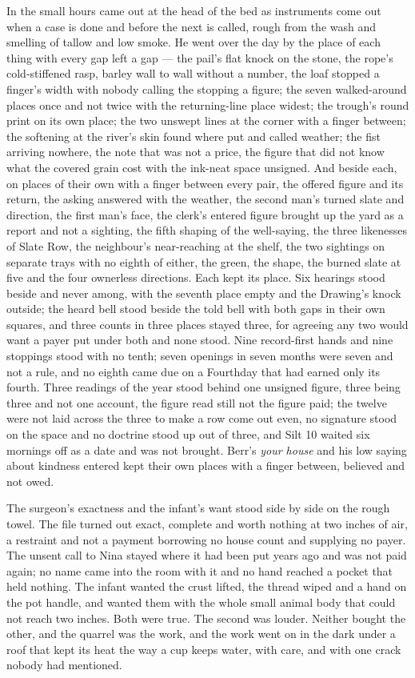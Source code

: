 In the small hours  came out at the head of the bed as instruments come out when a case is done and before the next is called, rough from the wash and smelling of tallow and low smoke. He went over the day by the place of each thing with every gap left a gap --- the pail's flat knock on the stone, the rope's cold-stiffened rasp, barley wall to wall without a number, the loaf stopped a finger's width with nobody calling the stopping a figure; the seven walked-around places once and not twice with the returning-line place widest; the trough's round print on its own place; the two unswept lines at the corner with a finger between; the softening at the river's skin found where put and called weather; the fist arriving nowhere, the note that was not a price, the figure that did not know what the covered grain cost with the ink-neat space unsigned. And beside each, on places of their own with a finger between every pair, the offered figure and its return, the asking answered with the weather, the second man's turned slate and direction, the first man's face, the clerk's entered figure brought up the yard as a report and not a sighting, the fifth shaping of the well-saying, the three likenesses of Slate Row, the neighbour's near-reaching at the shelf, the two sightings on separate trays with no eighth of either, the green, the shape, the burned slate at five and the four ownerless directions. Each kept its place. Six hearings stood beside and never among, with the seventh place empty and the Drawing's knock outside; the heard bell stood beside the told bell with both gaps in their own squares, and three counts in three places stayed three, for agreeing any two would want a payer put under both and none stood. Nine record-first hands and nine stoppings stood with no tenth; seven openings in seven months were seven and not a rule, and no eighth came due on a Fourthday that had earned only its fourth. Three readings of the year stood behind one unsigned figure, three being three and not one account, the figure read still not the figure paid; the twelve were not laid across the three to make a row come out even, no signature stood on the space and no doctrine stood up out of three, and Silt 10 waited six mornings off as a date and was not brought. Berr's \emph{your house} and his low saying about kindness entered kept their own places with a finger between, believed and not owed.

The surgeon's exactness and the infant's want stood side by side on the rough towel. The file turned out exact, complete and worth nothing at two inches of air, a restraint and not a payment borrowing no house count and supplying no payer. The unsent call to Nina stayed where it had been put years ago and was not paid again; no name came into the room with it and no hand reached a pocket that held nothing. The infant wanted the crust lifted, the thread wiped and a hand on the pot handle, and wanted them with the whole small animal body that could not reach two inches. Both were true. The second was louder. Neither bought the other, and the quarrel was the work, and the work went on in the dark under a roof that kept its heat the way a cup keeps water, with care, and with one crack nobody had mentioned.

